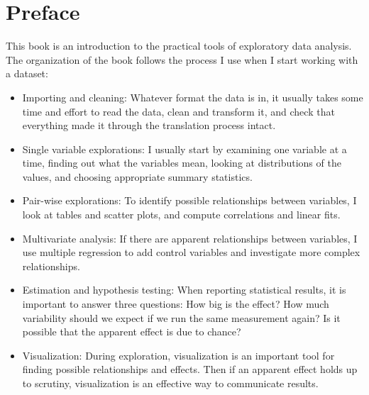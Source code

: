 \documentclass[12pt]{book}
\begin{document}
\fi

\chapter{Preface}
\label{preface}

This book is an
introduction to the practical tools of exploratory data analysis.
The organization of the book follows the process I use
when I start working with a dataset:

\begin{itemize}

\item Importing and cleaning: Whatever format the data is in, it
  usually takes some time and effort to read the data, clean and
  transform it, and check that everything made it through the
  translation process intact.

\item Single variable explorations: I usually start by examining one
  variable at a time, finding out what the variables mean, looking
  at distributions of the values, and choosing appropriate
  summary statistics.

\item Pair-wise explorations: To identify possible relationships
  between variables, I look at tables and scatter plots, and compute
  correlations and linear fits.

\item Multivariate analysis: If there are apparent relationships
  between variables, I use multiple regression to add control variables
  and investigate more complex relationships.

\item Estimation and hypothesis testing: When reporting statistical
  results, it is important to answer three questions: How big is
  the effect?  How much variability should we expect if we run the same
  measurement again?  Is it possible that the apparent effect is
  due to chance?

\item Visualization: During exploration, visualization is an important 
  tool for finding possible relationships and effects.  Then if an
  apparent effect holds up to scrutiny, visualization is an effective
  way to communicate results.

\end{itemize}
\end{document}
